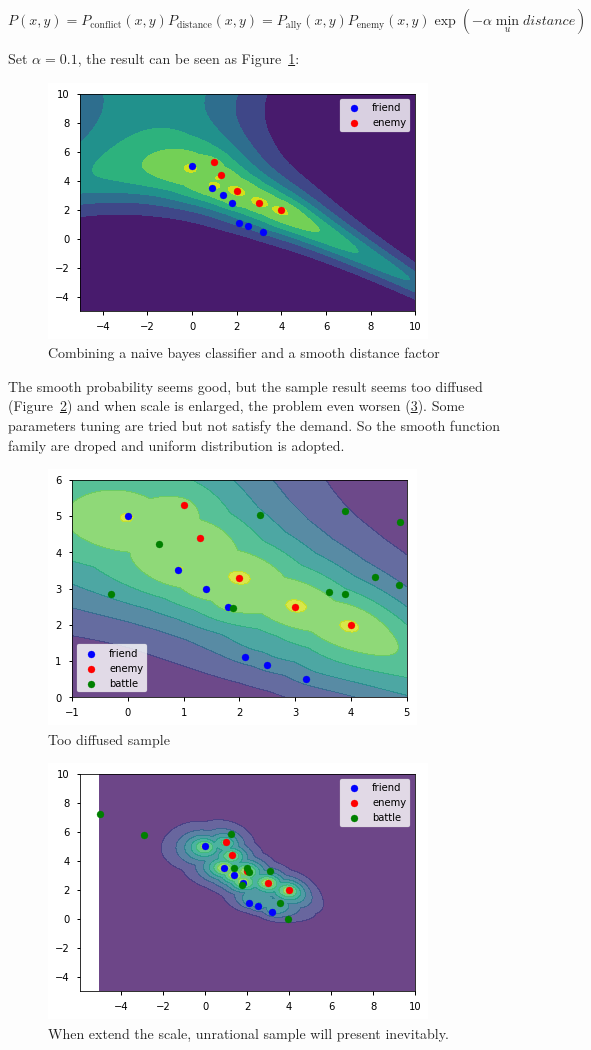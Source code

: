 \documentclass{article}
\begin{document}
$$
P(x,y) = P_{\text{conflict}}(x,y) P_{\text{distance}}(x,y) = 
P_\text{ally}(x,y) P_\text{enemy}(x,y) \exp(-\alpha \min_{u} distance)
$$

Set $\alpha=0.1$, the result can be seen as Figure~\ref{fig:combOne}:

\begin{figure}[h!]
\includegraphics[width=0.6\linewidth]{comb1.png}
\caption{Combining a naive bayes classifier and a smooth distance factor}
\label{fig:combOne}
\end{figure}

The smooth probability seems good, but the sample result seems too diffused 
(Figure~\ref{fig:combTwo}) and when scale is enlarged, the problem even worsen (\ref{fig:combThree}).
Some parameters tuning are tried but not satisfy the demand. So the smooth function family are droped 
and uniform distribution is adopted. 

\begin{figure}[h!]
\includegraphics[width=0.6\linewidth]{comb2.png}
\caption{Too diffused sample}
\label{fig:combTwo}
\end{figure}

\begin{figure}[h!]
\includegraphics[width=0.6\linewidth]{comb4.png}
\caption{When extend the scale, unrational sample will present inevitably.}
\label{fig:combThree}
\end{figure}
\end{document}
